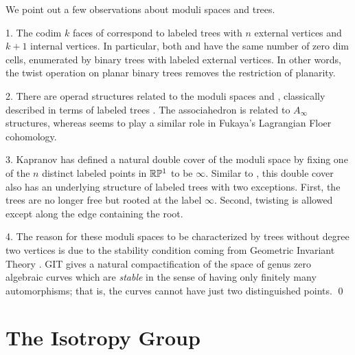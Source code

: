 \documentclass[10pt]{amsart}
\begin{document}
        \begin{rem} We point out a few observations about moduli spaces and trees.
        
        1. The codim $k$ faces of  correspond to labeled trees with $n$ external vertices and $k+1$ internal vertices. In particular, both  and  have the same number of zero dim cells, enumerated by binary trees with labeled external vertices.  In other words, the twist operation on planar binary trees removes the restriction of planarity.
        
        2. There are operad structures related to the moduli spaces  \cite{dev} and  \cite{gk}, classically  described in terms of labeled trees \cite[\S 1.4]{bv}. The associahedron is related to $A_\infty$ structures, whereas  seems to play a similar role in Fukaya's Lagrangian Floer cohomology.
        
        3. Kapranov \cite{kap} has defined a natural double cover of the moduli space  by fixing one of the $n$ distinct labeled points in ${\mathbb R} {\mathbb P}^1$ to be $\infty$. Similar to , this double cover also has an underlying structure of labeled trees \cite[\S 4.3]{dev} with two exceptions. First, the trees are no longer free but rooted at the label $\infty$.  Second, twisting is allowed except along the edge containing the root.
        
        4. The reason for these moduli spaces to be characterized by trees without degree two vertices is due to the stability condition coming from Geometric Invariant Theory \cite[\S 8]{git}.  GIT gives a natural compactification of the space of  genus zero algebraic curves which are {\em stable} in the sense of having only finitely many automorphisms; that is, the curves cannot have just two distinguished points.
        \qed
        
        \end{rem}
        
        
        \section {The Isotropy Group}
        
\end{document}
